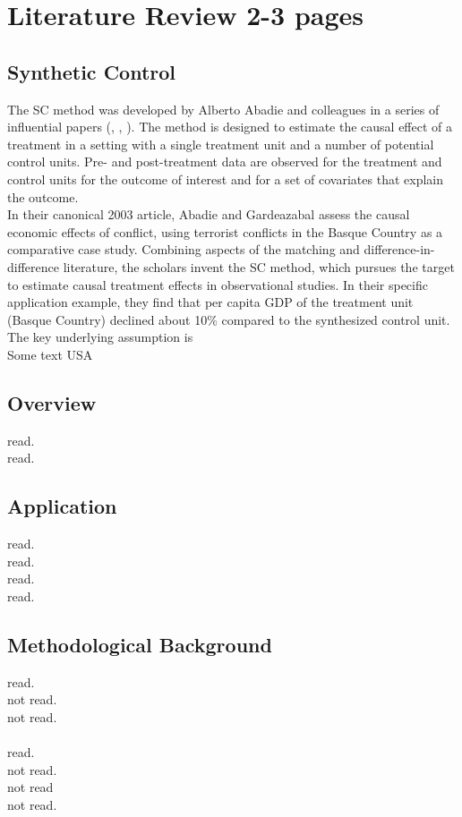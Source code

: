 \section{Literature Review 2-3 pages}

\subsection{Synthetic Control}
The \ac{SC} method was developed by Alberto Abadie and colleagues in a series of influential papers (\cite{abadie:2003}, \cite{abadie:2007}, \cite{abadie:2015}). The method is designed to estimate the causal effect of a treatment in a setting with a single treatment unit and a number of potential control units. Pre- and post-treatment data are observed for the treatment and control units for the outcome of interest and for a set of covariates that explain the outcome. \\
In their canonical 2003 article, Abadie and Gardeazabal assess the causal economic effects of conflict, using terrorist conflicts in the Basque Country as a comparative case study. Combining aspects of the matching and difference-in-difference literature, the scholars invent the \ac{SC} method, which pursues the target to estimate causal treatment effects in observational studies. In their specific application example, they find that per capita \ac{GDP} of the treatment unit (Basque Country) declined about 10\% compared to the synthesized control unit. The key underlying assumption is 
\\
Some text \ac{USA}

\subsection{Overview}
\cite{abadie:2021a} read.\\
\cite{athey:2016} read.

\subsection{Application}
\cite{born:2019} read. \\
\cite{cho:2020} read.\\
\cite{cunningham:2021} read.\\
\cite{funke:2020} read.

\subsection{Methodological Background}
\cite{abadie:2011} read.\\
\cite{abadie:2006} not read.\\
\cite{abadie:2002} not read.\\
\cite{doudchenko:2016} \\
\cite{ferman:2021} read.\\
\cite{frangakis:2002} not read.\\
\cite{rosenbaum:1983} not read \\
\cite{rubin:1974} not read.

